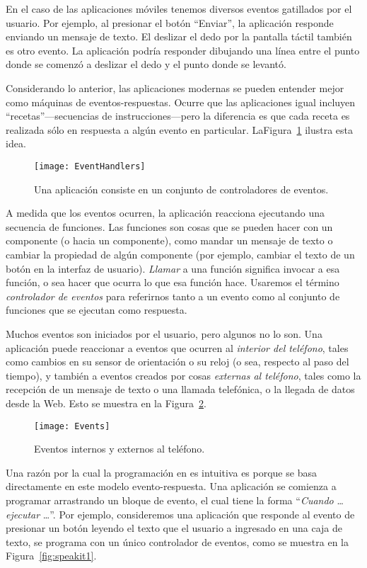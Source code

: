 En el caso de las aplicaciones móviles tenemos diversos eventos gatillados por el usuario. Por ejemplo, al presionar el botón ``Enviar'', la aplicación responde enviando un mensaje de texto. El deslizar el dedo por la pantalla táctil también es otro evento. La aplicación podría responder dibujando una línea entre el punto donde se comenzó a deslizar el dedo y el punto donde se levantó.

Considerando lo anterior, las aplicaciones modernas se pueden entender mejor como máquinas de eventos-respuestas. Ocurre que las aplicaciones igual incluyen “recetas”—secuencias de instrucciones—pero la diferencia es que cada receta es realizada sólo en respuesta a algún evento en particular. LaFigura~\ref{fig:eventHandlers} ilustra esta idea.

\begin{figure}[H]
  \centering
  \texttt{[image: EventHandlers]}
  \caption{Una aplicación consiste en un conjunto de controladores de eventos.}
  \label{fig:eventHandlers}
\end{figure}

A medida que los eventos ocurren, la aplicación reacciona ejecutando una secuencia de funciones. Las funciones son cosas que se pueden hacer con un componente (o hacia un componente), como mandar un mensaje de texto o cambiar la propiedad de algún componente (por ejemplo, cambiar el texto de un botón en la interfaz de usuario). \emph{Llamar} a una función significa invocar a esa función, o sea hacer que ocurra lo que esa función hace. Usaremos el término \emph{controlador de eventos} para referirnos tanto a un evento como al conjunto de funciones que se ejecutan como respuesta.

Muchos eventos son iniciados por el usuario, pero algunos no lo son. Una aplicación puede reaccionar a eventos que ocurren al \emph{interior del teléfono}, tales como cambios en su sensor de orientación o su reloj (o sea, respecto al paso del tiempo), y también a eventos creados por cosas \emph{externas al teléfono}, tales como la recepción de un mensaje de texto o una llamada telefónica, o la llegada de datos desde la Web. Esto se muestra en la Figura~\ref{fig:events}.

\begin{figure}[H]
  \centering
  \texttt{[image: Events]}
  \caption{Eventos internos y externos al teléfono.}
  \label{fig:events}
\end{figure}

Una razón por la cual la programación en \AppInventor es intuitiva es porque se basa directamente en este modelo evento-respuesta. Una aplicación se comienza a programar arrastrando un bloque de evento, el cual tiene la forma ``\emph{Cuando} \ldots \emph{ejecutar} \ldots''. Por ejemplo, consideremos una aplicación que responde al evento de presionar un botón leyendo el texto que el usuario a ingresado en una caja de texto, se programa con un único controlador de eventos, como se muestra en la Figura~\ref{fig:speakit1}.

